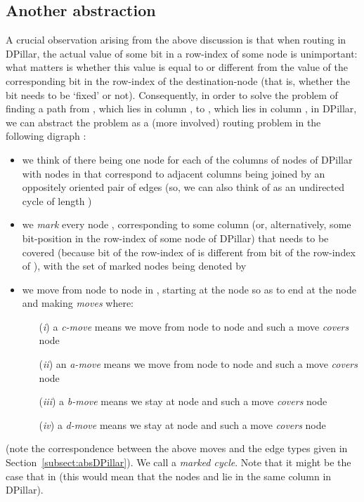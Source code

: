 \documentclass{article}
\begin{document}
\subsection{Another abstraction}

A crucial observation arising from the above discussion is that when routing in DPillar, the actual value of some bit in a row-index of some node is unimportant: what matters is whether this value is equal to or different from the value of the corresponding bit in the row-index of the destination-node (that is, whether the bit needs to be `fixed' or not). Consequently, in order to solve the problem of finding a path from , which lies in column , to , which lies in column , in DPillar, we can abstract the problem as a (more involved) routing problem in the following digraph :
\begin{itemize}
\item we think of there being one node for each of the  columns of nodes of DPillar with nodes in  that correspond to adjacent columns being joined by an oppositely oriented pair of edges (so, we can also think of  as an undirected cycle of length )
\item we \emph{mark\/} every node , corresponding to some column  (or, alternatively, some bit-position  in the row-index of some node of DPillar) that needs to be covered (because bit  of the row-index of  is different from bit  of the row-index of ), with the set of marked nodes being denoted by 
\item we move from node to node in , starting at the node  so as to end at the node  and making \emph{moves\/} where:
\begin{itemize}
\item[(\emph{i\/})] a \emph{c-move\/} means we move from node  to node  and such a move \emph{covers\/} node 
\item[(\emph{ii\/})] an \emph{a-move\/} means we move from node  to node  and such a move \emph{covers\/} node 
\item[(\emph{iii\/})] a \emph{b-move\/} means we stay at node  and such a move \emph{covers\/} node 
\item[(\emph{iv\/})] a \emph{d-move\/} means we stay at node  and such a move \emph{covers\/} node 
\end{itemize}
\end{itemize}
(note the correspondence between the above moves and the edge types given in Section~\ref{subsect:absDPillar}). 
We call  a \emph{marked cycle\/}. Note that it might be the case that  in  (this would mean that the nodes  and  lie in the same column in DPillar).
\end{document}
